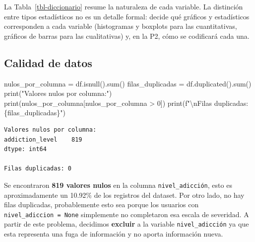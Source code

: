 \documentclass[11pt,spanish,a4paper,]{article}
\newenvironment{Shaded}{\begin{snugshade}}{\end{snugshade}}
\newcommand{\BuiltInTok}[1]{\textcolor[rgb]{0.00,0.23,0.31}{#1}}
\newcommand{\CharTok}[1]{\textcolor[rgb]{0.13,0.47,0.30}{#1}}
\newcommand{\DecValTok}[1]{\textcolor[rgb]{0.68,0.00,0.00}{#1}}
\newcommand{\NormalTok}[1]{\textcolor[rgb]{0.00,0.23,0.31}{#1}}
\newcommand{\OperatorTok}[1]{\textcolor[rgb]{0.37,0.37,0.37}{#1}}
\newcommand{\SpecialCharTok}[1]{\textcolor[rgb]{0.37,0.37,0.37}{#1}}
\newcommand{\SpecialStringTok}[1]{\textcolor[rgb]{0.13,0.47,0.30}{#1}}
\newcommand{\StringTok}[1]{\textcolor[rgb]{0.13,0.47,0.30}{#1}}
\begin{document}
La Tabla~\ref{tbl-diccionario} resume la naturaleza de cada variable. La
distinción entre tipos estadísticos no es un detalle formal: decide qué
gráficos y estadísticos corresponden a cada variable (histogramas y
boxplots para las cuantitativas, gráficos de barras para las
cualitativas) y, en la P2, cómo se codificará cada una.

\subsection{Calidad de datos}\label{calidad-de-datos}

\protect{}\label{val-nulos-colum-duplicadas}
\begin{Shaded}
\begin{Highlighting}[]
\NormalTok{nulos\_por\_columna }\OperatorTok{=}\NormalTok{ df.isnull().}\BuiltInTok{sum}\NormalTok{()}
\NormalTok{filas\_duplicadas }\OperatorTok{=}\NormalTok{ df.duplicated().}\BuiltInTok{sum}\NormalTok{()}
\BuiltInTok{print}\NormalTok{(}\StringTok{"Valores nulos por columna:"}\NormalTok{)}
\BuiltInTok{print}\NormalTok{(nulos\_por\_columna[nulos\_por\_columna }\OperatorTok{\textgreater{}} \DecValTok{0}\NormalTok{])}
\BuiltInTok{print}\NormalTok{(}\SpecialStringTok{f"}\CharTok{\textbackslash{}n}\SpecialStringTok{Filas duplicadas: }\SpecialCharTok{\{}\NormalTok{filas\_duplicadas}\SpecialCharTok{\}}\SpecialStringTok{"}\NormalTok{)}
\end{Highlighting}
\end{Shaded}

\begin{verbatim}
Valores nulos por columna:
addiction_level    819
dtype: int64

Filas duplicadas: 0
\end{verbatim}

Se encontraron \textbf{819 valores nulos} en la columna
\texttt{nivel\_adicción}, esto es aproximadamente un 10.92\% de los
registros del dataset. Por otro lado, no hay filas duplicadas,
probablemente esto sea porque los usuarios con
\texttt{nivel\_adiccion\ =\ None} simplemente no completaron esa escala
de severidad. A partir de este problema, decidimos \textbf{excluir} a la
variable \texttt{nivel\_adicción} ya que esta representa una fuga de
información y no aporta información nueva.
\end{document}
